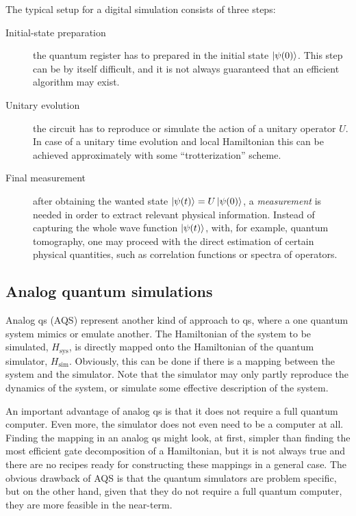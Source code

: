 The typical setup for a digital simulation consists of three steps:
\begin{description}
    \item[Initial-state preparation] the quantum register has to prepared in the initial state $\ket{\psi(0)}$.
        This step can be by itself difficult, and it is not always guaranteed that an efficient algorithm may exist.

    \item[Unitary evolution]  the circuit has to reproduce or simulate the action of a unitary operator $U$.
        In case of a unitary time evolution and local Hamiltonian this can be achieved approximately with some ``trotterization'' scheme.

    \item[Final measurement] after obtaining the wanted state $\ket{\psi(t)} = U \ket{\psi(0)}$, a \emph{measurement} is needed in order to extract relevant physical information.
        Instead of capturing the whole wave function $\ket{\psi(t)}$, with, for example, quantum tomography, one may proceed with the direct estimation of certain physical quantities, such as correlation functions or spectra of operators.
\end{description}




\subsection{Analog quantum simulations}
\label{sub:analog_quantum_simulations}

Analog \ac{qs} (AQS) represent another kind of approach to \ac{qs}, where a one quantum system mimics or emulate another.
The Hamiltonian of the system to be simulated, $H_{\text{sys}}$, is directly mapped onto the Hamiltonian of the quantum simulator, $H_{\text{sim}}$.
Obviously, this can be done if there is a mapping between the system and the simulator.
Note that the simulator may only partly reproduce the dynamics of the system, or simulate some effective description of the system.

An important advantage of analog \ac{qs} is that it does not require a full quantum computer.
Even more, the simulator does not even need to be a computer at all.
Finding the mapping in an analog \ac{qs} might look, at first, simpler than finding the most efficient gate decomposition of a Hamiltonian, but it is not always true and there are no recipes ready for constructing these mappings in a general case.
The obvious drawback of AQS is that the quantum simulators are problem specific, but on the other hand, given that they do not require a full quantum computer, they are more feasible in the near-term.


